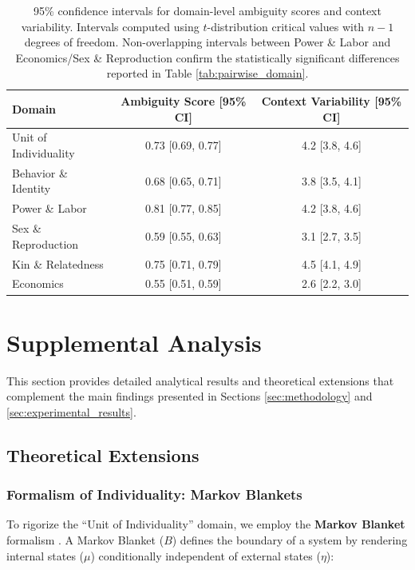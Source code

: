 \documentclass[
]{article}
\numberwithin{equation}{section}
\begin{document}
\begin{table}[h]
\centering
\begin{tabular}{|l|c|c|}
\hline
\textbf{Domain} & \textbf{Ambiguity Score [95\% CI]} & \textbf{Context Variability [95\% CI]} \\
\hline
Unit of Individuality & 0.73 [0.69, 0.77] & 4.2 [3.8, 4.6] \\
Behavior \& Identity & 0.68 [0.65, 0.71] & 3.8 [3.5, 4.1] \\
Power \& Labor & 0.81 [0.77, 0.85] & 4.2 [3.8, 4.6] \\
Sex \& Reproduction & 0.59 [0.55, 0.63] & 3.1 [2.7, 3.5] \\
Kin \& Relatedness & 0.75 [0.71, 0.79] & 4.5 [4.1, 4.9] \\
Economics & 0.55 [0.51, 0.59] & 2.6 [2.2, 3.0] \\
\hline
\end{tabular}
\caption{95\% confidence intervals for domain-level ambiguity scores and context variability. Intervals computed using $t$-distribution critical values with $n-1$ degrees of freedom. Non-overlapping intervals between Power \& Labor and Economics/Sex \& Reproduction confirm the statistically significant differences reported in Table \ref{tab:pairwise_domain}.}
\label{tab:domain_ci}
\end{table}

\newpage

\section{Supplemental Analysis}\label{sec:supplemental_analysis}

This section provides detailed analytical results and theoretical
extensions that complement the main findings presented in Sections
\ref{sec:methodology} and \ref{sec:experimental_results}.

\subsection{Theoretical Extensions}\label{theoretical-extensions}

\subsubsection{Formalism of Individuality: Markov
Blankets}\label{formalism-of-individuality-markov-blankets}

To rigorize the ``Unit of Individuality'' domain, we employ the
\textbf{Markov Blanket} formalism
\cite{friston2013life, kirchhoff2018markov}. A Markov Blanket (\(B\))
defines the boundary of a system by rendering internal states (\(\mu\))
conditionally independent of external states (\(\eta\)):
\end{document}
